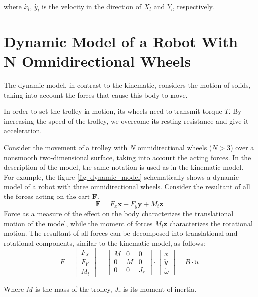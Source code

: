 \documentclass[oneside,final,14pt]{extreport}
\newcommand{\bs}{\boldsymbol}
\begin{document}
where $ \dot{x_{l}} $, $ \dot{y_{l}} $ is the velocity in the direction of $ X_{l} $ and $ Y_{l} $, respectively.
\fi

\chapter{Dynamic Model of a Robot With N Omnidirectional Wheels}
The dynamic model, in contrast to the kinematic, considers the motion of solids, taking into account the forces that cause this body to move.
 
In order to set the trolley in motion, its wheels need to transmit torque $ T $. By increasing the speed of the trolley, we overcome its resting resistance and give it acceleration.
 
Consider the movement of a trolley with $ N $ omnidirectional wheels ($ N> 3 $) over a nonsmooth two-dimensional surface, taking into account the acting forces. In the description of the model, the same notation is used as in the kinematic model. For example, the figure \ref{fig: dynamic_model} schematically shows a dynamic model of a robot with three omnidirectional wheels. Consider the resultant of all the forces acting on the cart $ \bs{F} $.
\begin{equation}
\bs{F}
=
F_{x} \bs{x}
+
F_{y} \bs{y}
+
M_{t} \bs{z}
\end{equation}
Force as a measure of the effect on the body characterizes the translational motion of the model, while the moment of forces $ M_{t} \bs{z} $ characterizes the rotational motion. The resultant of all forces can be decomposed into translational and rotational components, similar to the kinematic model, as follows:
\begin{equation}
F
=
\begin{bmatrix}
F_{X} \\
F_{Y} \\
M_{t}
\end{bmatrix}
=
\begin{bmatrix}
M & 0 & 0 \\
0 & M & 0 \\
0 & 0 & J_{r}
\end{bmatrix}
\cdot
\begin{bmatrix}
\ddot{x} \\
\ddot{y} \\
\dot{\omega}
\end{bmatrix}
=
B \cdot \ddot{u}
\end{equation}

Where $ M $ is the mass of the trolley, $ J_{r} $ is its moment of inertia.
\end{document}
